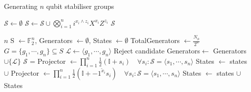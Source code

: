 \documentclass{standalone}
\begin{document}
\begin{algorithm}
\caption{Generating $n$ qubit stabiliser groups}
\label{alg:gengroups}
\begin{algorithmic}
    \State $\mathcal{S}\leftarrow\emptyset$
        \State $\mathcal{S}\leftarrow\mathcal{S}\cup \bigotimes_{i=1}^{n} i^{x_{i}\wedge z_{i}}X^{x_{i}}Z^{z_{i}}$ 
    \EndFor
    \State \Return $\mathcal{S}$
\EndFunction
\end{algorithmic}
\begin{algorithmic}[1]
\Require $n$ 
\Require {}
\State S $\leftarrow \mathbb{F}_{2}^{n}$, Generators $\leftarrow \emptyset$, States $\leftarrow\emptyset$
\State TotalGenerators $\leftarrow \frac{N_{\phi}}{2^{n}}$ 
    \State $G = \{g_{1},\cdots,g_{n}\}\subseteq S$
        \State $\mathcal{L}\leftarrow \langle g_{1},\cdots,g_{n}\rangle$
            \State Reject candidate
        \EndIf
            \State Generators$\leftarrow$ Generators $\cup \{\mathcal{L}\}$
        \EndIf
    \EndIf
\EndWhile
{}
    \State $\mathcal{S}$ = 
    \State Projector $\leftarrow \prod_{i=1}^{n}\frac{1}{2}\left(\mathbb{I} + s_{i}\right)\quad \forall s_{i}:\mathcal{S}=\langle s_{1},\cdots,s_{n}\rangle$
    \State States $\leftarrow$ states $\cup $ 
        \State Projector $\leftarrow \prod_{i=1}^{n}\frac{1}{2}\left(\mathbb{I} + -1^{\tilde{x}_{i}}s_{i}\right)\quad \forall s_{i}:\mathcal{S}=\langle s_{1},\cdots,s_{n}\rangle$
        \State States $\leftarrow$ states $\cup $ 
    \EndFor
\EndFor
\State \Return States
\end{algorithmic}
\end{algorithm}
\end{document}
